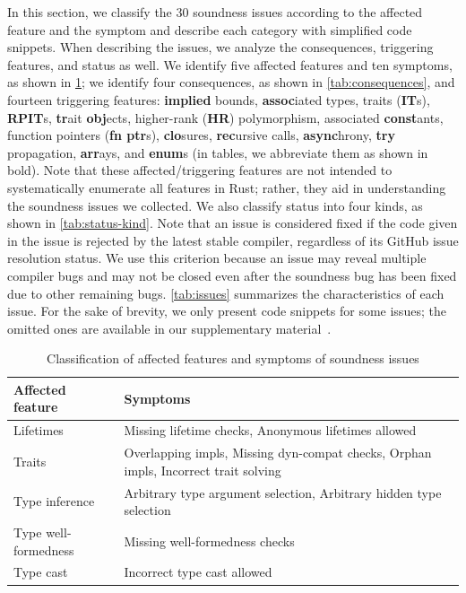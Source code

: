 In this section, we classify the 30 soundness issues according to the affected
feature and the symptom and describe each category with simplified code
snippets.
%
When describing the issues, we analyze the consequences, triggering features,
and status as well.
%
We identify five affected features and ten symptoms, as shown in
\cref{tab:features};
%
we identify four consequences, as shown in \cref{tab:consequences}, and fourteen
triggering features:
%
{\bf implied} bounds, {\bf assoc}iated types,  traits ({\bf IT}s), {\bf
RPIT}s, {\bf tr}ait {\bf obj}ects, higher-rank ({\bf HR}) polymorphism,
associated {\bf const}ants, function pointers ({\bf fn ptr}s), {\bf clo}sures,
{\bf rec}ursive calls, {\bf async}hrony, {\bf try} propagation, {\bf arr}ays,
and {\bf enum}s
%
(in tables, we abbreviate them as shown in bold).
%
Note that these affected/triggering features are not intended to systematically
enumerate all features in Rust;
%
rather, they aid in understanding the soundness issues we collected.
%
We also classify status into four kinds, as shown in \cref{tab:status-kind}.
%
Note that an issue is considered fixed if the code given in the issue is
rejected by the latest stable compiler, regardless of its GitHub issue
resolution status.
%
We use this criterion because an issue may reveal multiple compiler bugs and may
not be closed even after the soundness bug has been fixed due to other remaining
bugs.
%
\cref{tab:issues} summarizes the characteristics of each issue.
%
For the sake of brevity, we only present code snippets for some issues;
%
the omitted ones are available in our supplementary material~\cite{supp}.

\begin{table}[t]
\caption{Classification of affected features and symptoms of soundness issues}
\label{tab:features}
\vspace{-1.15em}
\renewcommand{\arraystretch}{0.9}
  {\scriptsize
\begin{tabular}{l|l}
  Affected feature & Symptoms \\ \hline
  Lifetimes & Missing lifetime checks, Anonymous lifetimes allowed \\
  Traits & Overlapping impls, Missing dyn-compat checks, Orphan impls, Incorrect trait solving \\
  Type inference & Arbitrary type argument selection, Arbitrary hidden type selection \\
  Type well-formedness & Missing well-formedness checks \\
  Type cast & Incorrect type cast allowed \\
\end{tabular}
  }
\vspace{-0.65em}
\end{table}

